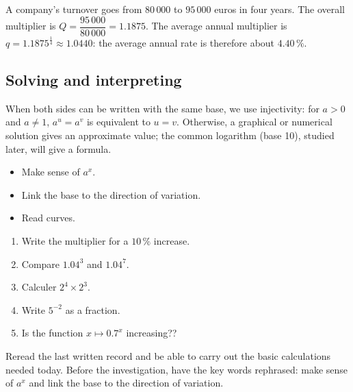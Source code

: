 \begin{exemple}
A company's turnover goes from $80\,000$ to $95\,000$ euros in four years. The overall multiplier is $Q=\dfrac{95\,000}{80\,000}=1.1875$. The average annual multiplier is $q=1.1875^{\frac14}\approx1.0440$: the average annual rate is therefore about $4.40\,\%$.
\end{exemple}

\subsection{Solving and interpreting}
When both sides can be written with the same base, we use injectivity: for $a>0$ and $a\neq1$, $a^u=a^v$ is equivalent to $u=v$. Otherwise, a graphical or numerical solution gives an approximate value; the common logarithm (base 10), studied later, will give a formula.

\begin{objectifs}\begin{itemize}\item Make sense of $a^x$.\item Link the base to the direction of variation.\item Read curves.\end{itemize}\end{objectifs}
\begin{automatismes}\begin{enumerate}\item Write the multiplier for a $10\,\%$ increase. \item Compare $1.04^3$ and $1.04^7$. \item Calculer $2^4\times2^3$. \item Write $5^{-2}$ as a fraction. \item Is the function $x\mapsto0.7^x$ increasing?? \end{enumerate}\end{automatismes}
\begin{prerequis}Reread the last written record and be able to carry out the basic calculations needed today. Before the investigation, have the key words rephrased: make sense of $a^x$ and link the base to the direction of variation.\end{prerequis}

